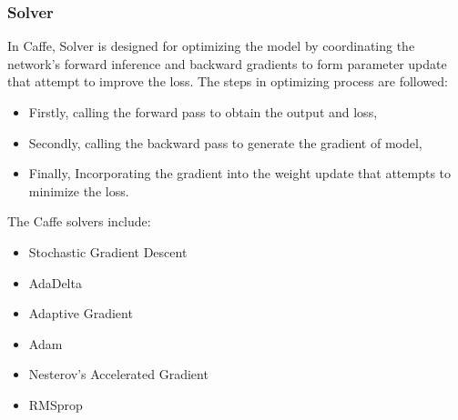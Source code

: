 \subsubsection{Solver}
In Caffe, Solver is designed for optimizing the model by coordinating the network's forward inference and backward gradients to form parameter update that attempt to improve the loss. The steps in optimizing process are followed:
\begin{itemize}
	\item Firstly, calling the forward pass to obtain the output and loss,
	\item Secondly, calling the backward pass to generate the gradient of model,
	\item Finally, Incorporating the gradient into the weight update that attempts to minimize the loss.
\end{itemize}
The Caffe solvers include:
\begin{itemize}
	\item Stochastic Gradient Descent
	\item AdaDelta
	\item Adaptive Gradient
	\item Adam
	\item Nesterov's Accelerated Gradient
	\item RMSprop
\end{itemize}
